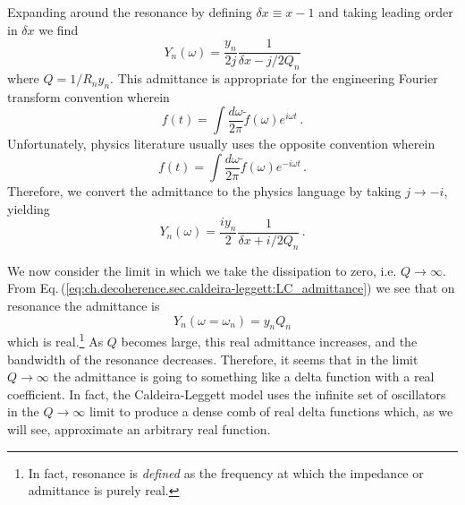 Expanding around the resonance by defining $\delta x \equiv x - 1$ and taking leading order in $\delta x$ we find
\begin{equation}
Y_n(\omega) = \frac{y_n}{2j} \frac{1}{\delta x - j/2 Q_n}
\end{equation}
where $Q = 1 / R_n y_n$.
This admittance is appropriate for the engineering Fourier transform convention wherein
\begin{equation}
f(t) = \int \frac{d\omega}{2 \pi} \tilde{f}(\omega) e^{i \omega t} \, .
\end{equation}
Unfortunately, physics literature usually uses the opposite convention wherein
\begin{equation}
f(t) = \int \frac{d\omega}{2 \pi} \tilde{f}(\omega) e^{-i \omega t} \, .
\end{equation}
Therefore, we convert the admittance to the physics language by taking $j \rightarrow -i$, yielding
\begin{equation}
Y_n(\omega) = \frac{i y_n}{2} \frac{1}{\delta x + i/2 Q_n} \, . \label{eq:ch.decoherence.sec.caldeira-leggett:LC_admittance}
\end{equation}

We now consider the limit in which we take the dissipation to zero, i.e. $Q \rightarrow \infty$.
From Eq.\,(\ref{eq:ch.decoherence.sec.caldeira-leggett:LC_admittance}) we see that on resonance the admittance is
\begin{equation}
Y_n(\omega = \omega_n) = y_n Q_n
\end{equation}
which is real.\footnote{In fact, resonance is \emph{defined} as the frequency at which the impedance or admittance is purely real.}
As $Q$ becomes large, this real admittance increases, and the bandwidth of the resonance decreases.
Therefore, it seems that in the limit $Q \rightarrow \infty$ the admittance is going to something like a delta function with a real coefficient.
In fact, the Caldeira-Leggett model uses the infinite set of oscillators in the $Q\rightarrow \infty$ limit to produce a dense comb of real delta functions which, as we will see, approximate an arbitrary real function.

